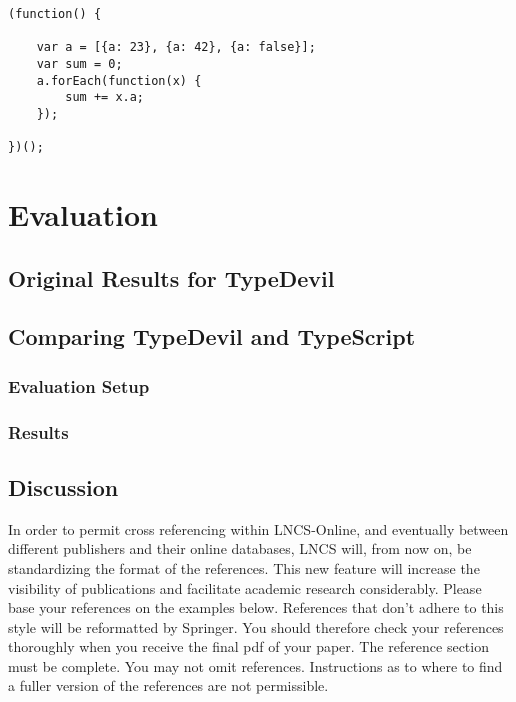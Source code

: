 \documentclass[runningheads,a4paper]{llncs}
\begin{document}
\lstset{language=javascript}
\begin{minipage}{\linewidth}
\begin{lstlisting}[frame=single, caption=inconsistent\_foreach.js]
(function() {
    
    var a = [{a: 23}, {a: 42}, {a: false}];
    var sum = 0;
    a.forEach(function(x) {
        sum += x.a;
    });
    
})();
\end{lstlisting}
\end{minipage}




\section{Evaluation}

\subsection{Original Results for TypeDevil}

\subsection{Comparing TypeDevil and TypeScript} \label{comparison}

\subsubsection{Evaluation Setup}

\subsubsection{Results}


\subsection{Discussion}


In order to permit cross referencing within LNCS-Online, and eventually
between different publishers and their online databases, LNCS will,
from now on, be standardizing the format of the references. This new
feature will increase the visibility of publications and facilitate
academic research considerably. Please base your references on the
examples below. References that don't adhere to this style will be
reformatted by Springer. You should therefore check your references
thoroughly when you receive the final pdf of your paper.
The reference section must be complete. You may not omit references.
Instructions as to where to find a fuller version of the references are
not permissible.
\end{document}
